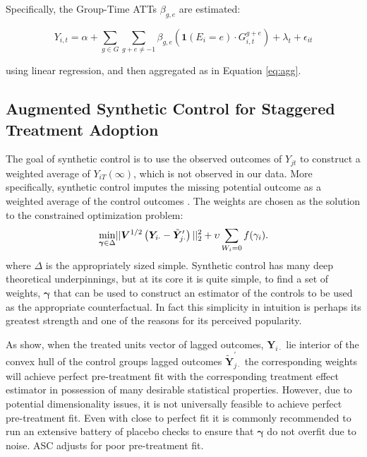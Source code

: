 \documentclass[12pt]{amsart}
\begin{document}
Specifically, the Group-Time ATTs $\beta_{g,e}$ are estimated:

\begin{equation}
    Y_{i,t} = \alpha + \sum_{g \in G} \sum_{g + e \neq -1} \beta_{g,e} ({\textbf{1}}(E_i = e) \cdot G^{g+e}_{i,t}) + \lambda_t + \epsilon_{it}
\end{equation}

using linear regression, and then aggregated as in Equation \eqref{eq:agg}. 

\subsection{Augmented Synthetic Control for Staggered Treatment Adoption}

The goal of synthetic control is to use the observed outcomes of $Y_{jt}$ to construct a weighted average of $Y_{iT}(\infty)$, which is not observed in our data. More specifically, synthetic control imputes the missing potential outcome as a weighted average of the control outcomes \cite{abadie2010synthetic,abadie2021using}. The weights are chosen as the solution to the constrained optimization problem:
\begin{align}\label{eq:SCM}
    \underset{\bm{\gamma}\in\Delta}{\min} ||\bm{V}^{1/2}\left(\bm{Y}_{i\cdot}-\tilde{\bm{ Y}}^\prime_{j\cdot}\right)||^2_2+\upsilon\sum\limits_{W_i=0}f(\gamma_i).\notag
\end{align}
where $\Delta$ is the appropriately sized simple. Synthetic control has many deep theoretical underpinnings, but at its core it is quite simple, to find a set of weights, $\bm\gamma$ that can be used to construct an estimator of the controls to be used as the appropriate counterfactual. In fact this simplicity in intuition is perhaps its greatest strength and one of the reasons for its perceived popularity. 

As  show, when the treated units vector of lagged outcomes, $\bm Y_{i\cdot}$ lie interior of the convex hull of the control groups lagged outcomes $\tilde{\bm{ Y}}^\prime_{j\cdot}$ the corresponding weights will achieve perfect pre-treatment fit with the corresponding treatment effect estimator in possession of many desirable statistical properties. However, due to potential dimensionality issues, it is not universally feasible to achieve perfect pre-treatment fit. Even with close to perfect fit it is commonly recommended \cite{ABADIE_ETAL:2015} to run an extensive battery of placebo checks to ensure that $\bm\gamma$ do not overfit due to noise. ASC  adjusts for poor pre-treatment fit. 
\end{document}
